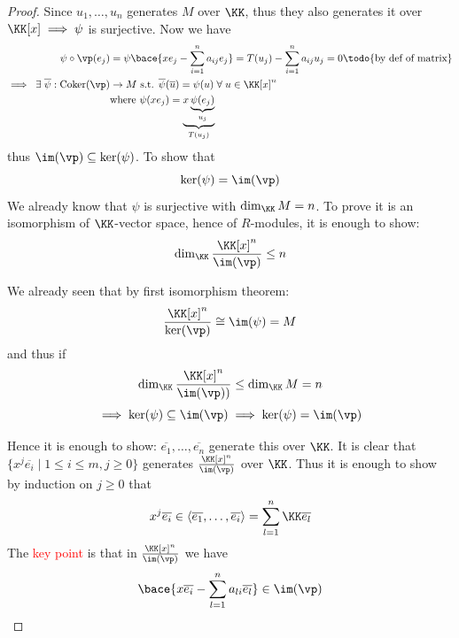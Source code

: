 \begin{proof}
	Since \( u_1,\ldots, u_n \) generates \( M \) over \( \KK \), thus they also generates it over \(
	\KK[x] \implies \psi\) is surjective. Now we have
	\[
		\begin{aligned}
			\psi \circ \vp (e_j)                                         & = \psi\bace{xe_j - \sum_{i=1}^n a_{ij}e_j } = T(u_j) - \sum_{i=1}^n
			a_{ij} u_j = 0 \text{\todo{by def of matrix}}                                                                                                                                             \\
			\implies \; \exists \;    \overline{\psi}: \text{Coker}(\vp) & \to M \text{ s.t. }
			\overline{\psi}(\overline{u}) = \psi(u) \; \forall \; u \in \KK[x]^n                                                                                                                      \\
			                                                             & \text{where } \psi(xe_j)                                             = \underbrace{x\underbrace{\psi(e_j)}_{u_j}}_{T(u_j)}
		\end{aligned}
	\]
	thus \( \im(\vp) \subseteq \ker(\psi)  \).
	To show that
	\[
		\ker(\psi) = \im (\vp)
	\]
	We already know that \( \psi \) is surjective with \(
	\dim_{\KK} M = n \). To prove it is an isomorphism of \( \KK \)-vector space, hence of \( R
	\)-modules, it is enough to show:
	\[
		\dim_{\KK} \frac{\KK[x]^n}{\im(\vp)} \leq n
	\]
	\begin{note}
		We already seen that by first isomorphism theorem:
		\[
			\frac{\KK[x]^n}{\ker(\vp)} \cong \im(\psi) = M
		\]
		and thus if
		\[
			\dim_{\KK} \frac{\KK[x]^n}{\im(\vp))} \leq  \dim_{\KK} M = n
		\]
		\[
			\implies \ker(\psi) \subseteq \im(\vp) \implies \ker(\psi) = \im(\vp)
		\]
	\end{note}
	Hence it is enough to show: \( \overline{e_1}, \ldots, \overline{e_n} \) generate this over \( \KK \).
	It is clear that \( \{x^j \overline{e_i} \; | \; 1 \leq i \leq m, j \geq 0\} \) generates \(
	\frac{\KK[x]^n}{\im(\vp)} \) over \( \KK \). Thus it is enough to show by induction on \( j \geq 0 \) that
	\[
		x^j \overline{e_i} \in \langle \overline{e_1}, \ldots, \overline{e_i} \rangle =  \sum_{l=1}^n \KK
		\overline{e_l}
	\]
	The \textcolor{red}{key point} is that in \( \frac{\KK[x]^n}{\im(\vp)} \) we have
	\[
		\begin{aligned}
			\bace{x\overline{e_i} - \sum_{l=1}^n a_{li}\overline{e_l}} & \in \im(\vp)                                                                \\

\end{aligned}\]
\end{proof}

